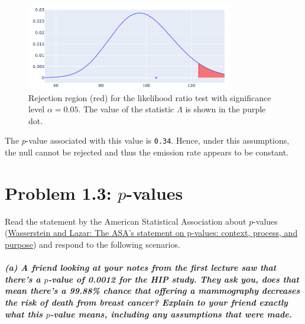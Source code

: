 \documentclass[11pt, english]{article}
\begin{document}
\begin{figure}[H]
	\centering
	\includegraphics[width=0.8\textwidth]{notRejected}
	\caption{Rejection region (red) for the likelihood ratio test with significance level $\alpha = 0.05$. The value of the statistic $\Lambda$ is shown in the purple dot.}
\end{figure}
    
    The \(p\)-value associated with this value is \texttt{0.34}. Hence, under this assumptions, the null cannot be rejected and thus the emission rate appears to be constant.

    \hypertarget{problem-1.3-p-values}{%
\section*{\texorpdfstring{\textbf{Problem 1.3:}
\(p\)-values}{Problem 1.3: p-values}}\label{problem-1.3-p-values}}

Read the statement by the American Statistical Association about
\(p\)-values
(\href{https://github.com/pipeton8/6.439-stats-comp-applications/blob/main/Assignments/1\%20-\%20Stats\%20Review/The\%20ASA\%20s\%20Statement\%20on\%20p\%20Values\%20Context\%20Process\%20and\%20Purpose.pdf}{Wasserstein
and Lazar: The ASA's statement on p-values: context, process, and
purpose}) and respond to the following scenarios.

    \hypertarget{a-a-friend-looking-at-your-notes-from-the-first-lecture-saw-that-theres-a-p-value-of-0.0012-for-the-hip-study.-they-ask-you-does-that-mean-theres-a-99.88-chance-that-offering-a-mammography-decreases-the-risk-of-death-from-breast-cancer-explain-to-your-friend-exactly-what-this-p-value-means-including-any-assumptions-that-were-made.}{%
\subparagraph{\texorpdfstring{(a) A friend looking at your notes from
the first lecture saw that there's a \(p\)-value of 0.0012 for the HIP
study. They ask you, does that mean there's a 99.88\% chance that
offering a mammography decreases the risk of death from breast cancer?
Explain to your friend exactly what this \(p\)-value means, including
any assumptions that were
made.\\[2ex]}{(a) A friend looking at your notes from the first lecture saw that there's a p-value of 0.0012 for the HIP study. They ask you, does that mean there's a 99.88\% chance that offering a mammography decreases the risk of death from breast cancer? Explain to your friend exactly what this p-value means, including any assumptions that were made.}}\label{a-a-friend-looking-at-your-notes-from-the-first-lecture-saw-that-theres-a-p-value-of-0.0012-for-the-hip-study.-they-ask-you-does-that-mean-theres-a-99.88-chance-that-offering-a-mammography-decreases-the-risk-of-death-from-breast-cancer-explain-to-your-friend-exactly-what-this-p-value-means-including-any-assumptions-that-were-made.}}
\end{document}
